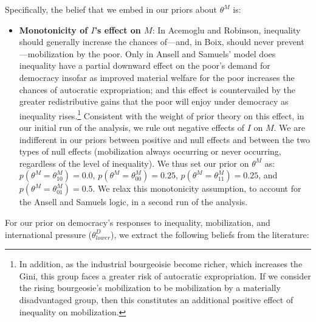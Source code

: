 \documentclass[
  12pt,
]{book}
\providecommand{\tightlist}{%
  \setlength{\itemsep}{0pt}\setlength{\parskip}{0pt}}
\begin{document}
Specifically, the belief that we embed in our priors about \(\theta^M\) is:

\begin{itemize}
\tightlist
\item
  \textbf{Monotonicity of \(I\)'s effect on \(M\)}: In Acemoglu and Robinson, inequality should generally increase the chances of---and, in Boix, should never prevent---mobilization by the poor. Only in Ansell and Samuels' model does inequality have a partial downward effect on the poor's demand for democracy insofar as improved material welfare for the poor increases the chances of autocratic expropriation; and this effect is countervailed by the greater redistributive gains that the poor will enjoy under democracy as inequality rises.\footnote{In addition, as the industrial bourgeoisie become richer, which increases the Gini, this group faces a greater risk of autocratic expropriation. If we consider the rising bourgeosie's mobilization to be mobilization by a materially disadvantaged group, then this constitutes an additional positive effect of inequality on mobilization.} Consistent with the weight of prior theory on this effect, in our initial run of the analysis, we rule out negative effects of \(I\) on \(M\). We are indifferent in our priors between positive and null effects and between the two types of null effects (mobilization always occurring or never occurring, regardless of the level of inequality). We thus set our prior on \(\theta^M\) as: \(p(\theta^M=\theta^M_{10})=0.0\), \(p(\theta^M=\theta^M_{00})=0.25\), \(p(\theta^M=\theta^M_{11})=0.25\), and \(p(\theta^M=\theta^M_{01})=0.5\). We relax this monotonicity assumption, to account for the Ansell and Samuels logic, in a second run of the analysis.
\end{itemize}

For our prior on democracy's responses to inequality, mobilization, and international pressure (\(\theta^D_{lower}\)), we extract the following beliefs from the literature:
\end{document}
